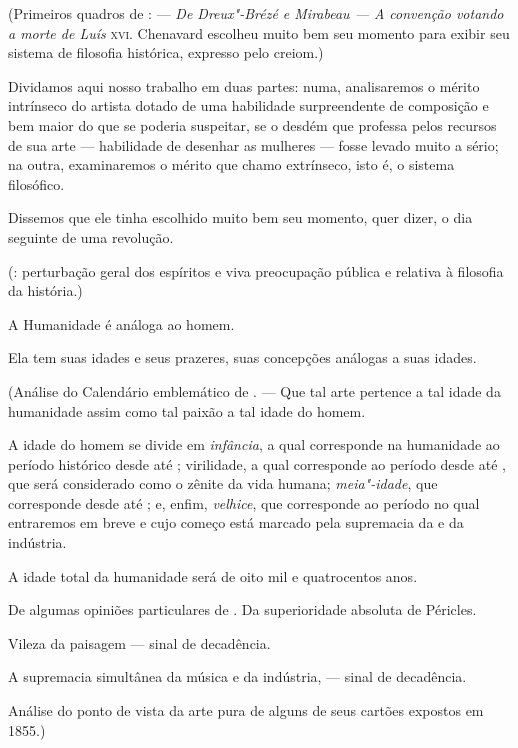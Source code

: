 (Primeiros quadros de : --- \textit{De Dreux"-Brézé e Mirabeau --- A
convenção votando a morte de Luís} \textsc{xvi}. Chenavard escolheu muito bem
seu momento para exibir seu sistema de filosofia histórica, expresso
pelo creiom.)

Dividamos aqui nosso trabalho em duas partes: numa, analisaremos o
mérito intrínseco do artista dotado de uma habilidade surpreendente de
composição e bem maior do que se poderia suspeitar, se o desdém que
professa pelos recursos de sua arte --- habilidade de desenhar as
mulheres --- fosse levado muito a sério; na outra, examinaremos o mérito
que chamo extrínseco, isto é, o sistema filosófico.

Dissemos que ele tinha escolhido muito bem seu momento, quer dizer, o
dia seguinte de uma revolução.

(: perturbação geral dos espíritos e viva preocupação
pública e relativa à filosofia da história.)

A Humanidade é análoga ao homem.

Ela tem suas idades e seus prazeres, suas concepções análogas a suas
idades.

(Análise do Calendário emblemático de . --- Que tal arte pertence
a tal idade da humanidade assim como tal paixão a tal idade do homem.

A idade do homem se divide em \textit{infância}, a qual corresponde na
humanidade ao período histórico desde  até ; virilidade, a
qual corresponde ao período desde  até , que será
considerado como o zênite da vida humana; \textit{meia"-idade}, que
corresponde desde  até ; e, enfim,
\textit{velhice}, que corresponde ao período no qual entraremos em
breve e cujo começo está marcado pela supremacia da  e da
indústria.

A idade total da humanidade será de oito mil e quatrocentos anos.

De algumas opiniões particulares de . Da superioridade absoluta
de Péricles.

Vileza da paisagem --- sinal de decadência.

A supremacia simultânea da música e da indústria, --- sinal de decadência.

Análise do ponto de vista da arte pura de alguns de seus cartões
expostos em 1855.)

